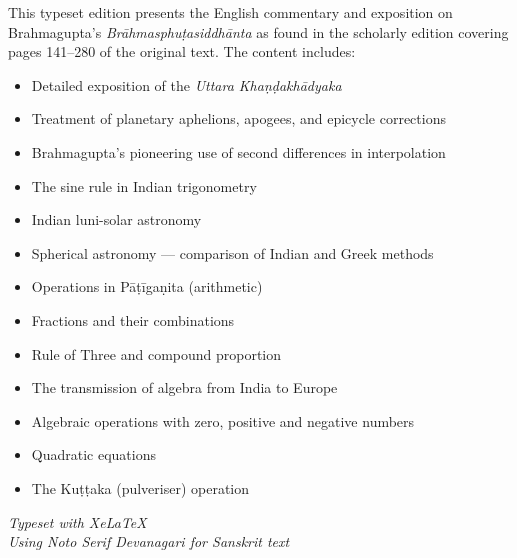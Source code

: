 \documentclass[11pt,a4paper]{article}
\begin{document}
This typeset edition presents the English commentary and exposition on Brahmagupta's \textit{Brāhmasphuṭasiddhānta} as found in the scholarly edition covering pages 141--280 of the original text. The content includes:

\begin{itemize}
\item Detailed exposition of the \textit{Uttara Khaṇḍakhādyaka}
\item Treatment of planetary aphelions, apogees, and epicycle corrections
\item Brahmagupta's pioneering use of second differences in interpolation
\item The sine rule in Indian trigonometry
\item Indian luni-solar astronomy
\item Spherical astronomy --- comparison of Indian and Greek methods
\item Operations in Pāṭīgaṇita (arithmetic)
\item Fractions and their combinations
\item Rule of Three and compound proportion
\item The transmission of algebra from India to Europe
\item Algebraic operations with zero, positive and negative numbers
\item Quadratic equations
\item The Kuṭṭaka (pulveriser) operation
\end{itemize}

\vspace{1cm}
\begin{flushright}
\textit{Typeset with XeLaTeX}\\
\textit{Using Noto Serif Devanagari for Sanskrit text}
\end{flushright}
\end{document}
